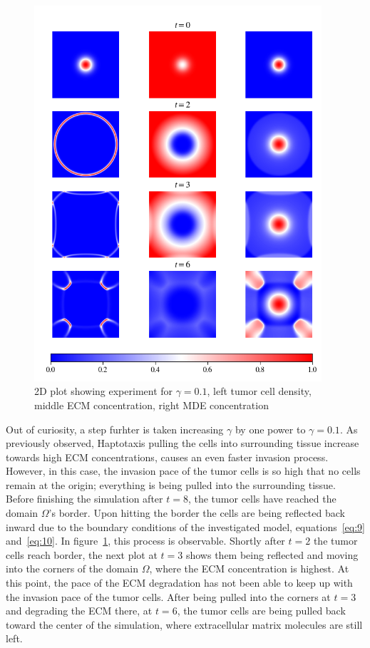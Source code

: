 \begin{figure}[h!]
 \centering
 \includegraphics[width=0.95\textwidth]{resources/images/gamma_2D_plot_.png}
 \caption{2D plot showing experiment for $\gamma=0.1$, left tumor cell density, middle ECM concentration, right MDE concentration}
 \label{fig:gamma_2D_plot}
\end{figure}
Out of curiosity, a step furhter is taken increasing $\gamma$ by one power to $\gamma=0.1$. As previously observed, Haptotaxis pulling the cells into surrounding tissue increase towards high ECM concentrations, causes an even faster invasion process. However, in this case, the invasion pace of the tumor cells is so high that no cells remain at the origin; everything is being pulled into the surrounding tissue. Before finishing the simulation after $t=8$, the tumor cells have reached the domain $\Omega$'s border. Upon hitting the border the cells are being reflected back inward due to the boundary conditions of the investigated model, equations~\ref{eq:9} and~\ref{eq:10}. In figure~\ref{fig:gamma_2D_plot}, this process is observable. Shortly after $t=2$ the tumor cells reach border, the next plot at $t=3$ shows them being reflected and moving into the corners of the domain $\Omega$, where the ECM concentration is highest. At this point, the pace of the ECM degradation has not been able to keep up with the invasion pace of the tumor cells. After being pulled into the corners at $t=3$ and degrading the ECM there, at $t=6$, the tumor cells are being pulled back toward the center of the simulation, where extracellular matrix molecules are still left.

